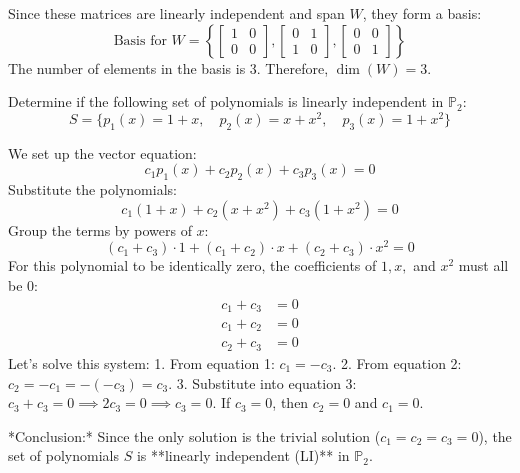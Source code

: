 \documentclass[11pt,a4paper]{article}
\begin{document}
\begin{solutionbox}
Since these matrices are linearly independent and span $W$, they form a basis:
\[ \text{Basis for } W = \left\{ \begin{bmatrix} 1 & 0 \\ 0 & 0 \end{bmatrix}, \begin{bmatrix} 0 & 1 \\ 1 & 0 \end{bmatrix}, \begin{bmatrix} 0 & 0 \\ 0 & 1 \end{bmatrix} \right\} \]
The number of elements in the basis is 3. Therefore, $\dim(W) = 3$.
\end{solutionbox}

\vspace{0.8cm}

\begin{questionbox}
Determine if the following set of polynomials is linearly independent in $\mathbb{P}_2$:
\[ S = \{ p_1(x) = 1 + x, \quad p_2(x) = x + x^2, \quad p_3(x) = 1 + x^2 \} \]
\end{questionbox}

\begin{solutionbox}
We set up the vector equation:
\[ c_1 p_1(x) + c_2 p_2(x) + c_3 p_3(x) = 0 \]
Substitute the polynomials:
\[ c_1 (1 + x) + c_2 (x + x^2) + c_3 (1 + x^2) = 0 \]
Group the terms by powers of $x$:
\[ (c_1 + c_3) \cdot 1 + (c_1 + c_2) \cdot x + (c_2 + c_3) \cdot x^2 = 0 \]
For this polynomial to be identically zero, the coefficients of $1, x,$ and $x^2$ must all be 0:
\begin{align*}
c_1 + c_3 &= 0 \\
c_1 + c_2 &= 0 \\
c_2 + c_3 &= 0
\end{align*}
Let's solve this system:
1. From equation 1: $c_1 = -c_3$.
2. From equation 2: $c_2 = -c_1 = -(-c_3) = c_3$.
3. Substitute into equation 3: $c_3 + c_3 = 0 \implies 2c_3 = 0 \implies c_3 = 0$.
If $c_3 = 0$, then $c_2 = 0$ and $c_1 = 0$.

*Conclusion:* Since the only solution is the trivial solution ($c_1 = c_2 = c_3 = 0$), the set of polynomials $S$ is **linearly independent (LI)** in $\mathbb{P}_2$.
\end{solutionbox}

\vspace{0.8cm}
\end{document}
